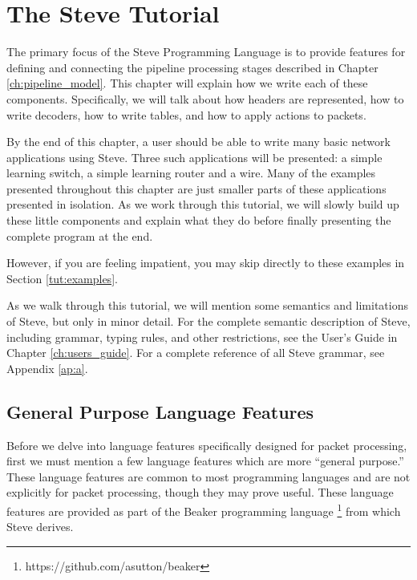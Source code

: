 \chapter{The Steve Tutorial} \label{ch:tutorial}


%

The primary focus of the Steve Programming Language is to provide features for defining and connecting the pipeline processing stages described in Chapter \ref{ch:pipeline_model}. This chapter will explain how we write each of these components. Specifically, we will talk about how headers are represented, how to write decoders, how to write tables, and how to apply actions to packets.

By the end of this chapter, a user should be able to write many basic network applications using Steve. Three such applications will be presented: a simple learning switch, a simple learning router and a wire. Many of the examples presented throughout this chapter are just smaller parts of these applications presented in isolation. As we work through this tutorial, we will slowly build up these little components and explain what they do before finally presenting the complete program at the end.

However, if you are feeling impatient, you may skip directly to these examples in Section \ref{tut:examples}.

As we walk through this tutorial, we will mention some semantics and limitations of Steve, but only in minor detail. For the complete semantic description of Steve, including grammar, typing rules, and other restrictions, see the User's Guide in Chapter \ref{ch:users_guide}. For a complete reference of all Steve grammar, see Appendix \ref{ap:a}.

\section{General Purpose Language Features} \label{tut:gen_purp}

Before we delve into language features specifically designed for packet processing, first we must mention a few language features which are more ``general purpose.'' These language features are common to most programming languages and are not explicitly for packet processing, though they may prove useful. These language features are provided as part of the Beaker programming language \footnote{https://github.com/asutton/beaker} from which Steve derives.

